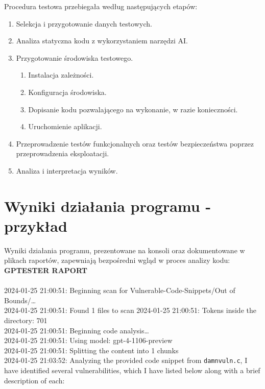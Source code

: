 Procedura testowa przebiegała według następujących etapów:
\begin{enumerate}
    \item Selekcja i przygotowanie danych testowych.
    \item Analiza statyczna kodu z wykorzystaniem narzędzi AI.
    \item Przygotowanie środowiska testowego.
    \begin{enumerate}
        \item Instalacja zależności.
        \item Konfiguracja środowiska.
        \item Dopisanie kodu pozwalającego na wykonanie, w razie konieczności.
        \item Uruchomienie aplikacji.
    \end{enumerate} 
    \item Przeprowadzenie testów funkcjonalnych oraz testów bezpieczeństwa poprzez przeprowadzenia eksploatacji.
    \item Analiza i interpretacja wyników.
\end{enumerate}

\section{Wyniki działania programu - przykład}
\label{sec:wyniki_dzialania_programu}

Wyniki działania programu, prezentowane na konsoli oraz dokumentowane w plikach raportów, zapewniają bezpośredni wgląd w proces analizy kodu: \\

\LARGE{\textbf{GPTESTER RAPORT}} \normalsize \\\\
2024-01-25 21:00:51: Beginning scan for Vulnerable-Code-Snippets/Out of Bounds/\ldots{} \\
2024-01-25 21:00:51: Found 1 files to scan 2024-01-25 21:00:51: Tokens inside the directory: 701 \\
2024-01-25 21:00:51: Beginning code analysis\ldots{} \\
2024-01-25 21:00:51: Using model: gpt-4-1106-preview \\
2024-01-25 21:00:51: Splitting the content into 1 chunks \\
2024-01-25 21:03:52: Analyzing the provided  code snippet from \texttt{damnvuln.c}, I have identified several vulnerabilities, which I have listed below along with a brief description of each: 

